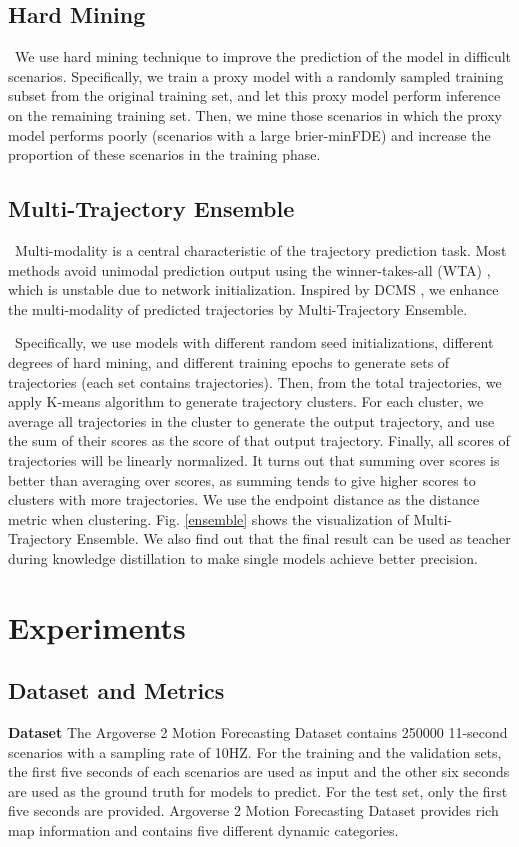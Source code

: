 \documentclass[10pt,twocolumn,letterpaper]{article}
\begin{document}
\subsection{Hard Mining}
    \ We use hard mining technique to improve the prediction of the model in difficult scenarios. Specifically, we train a proxy model with a randomly sampled training subset from the original training set, and let this proxy model perform inference on the remaining training set. Then, we mine those scenarios in which the proxy model performs poorly (scenarios with a large brier-minFDE) and increase the proportion of these scenarios in the training phase.
    
\subsection{Multi-Trajectory Ensemble}
    \ Multi-modality is a central characteristic of the trajectory prediction task. Most methods avoid unimodal prediction output using the winner-takes-all (WTA) \cite{lee2016stochastic}, which is unstable due to network initialization. Inspired by DCMS \cite{ye2022dcms}, we enhance the multi-modality of predicted trajectories by Multi-Trajectory Ensemble.
    
    \ Specifically, we use models with different random seed initializations, different degrees of hard mining, and different training epochs to generate  sets of trajectories (each set contains  trajectories). Then, from the total  trajectories, we apply K-means algorithm \cite{macqueen1967some} to generate  trajectory clusters. For each cluster, we average all trajectories in the cluster to generate the output trajectory, and use the sum of their scores as the score of that output trajectory. Finally, all  scores of trajectories will be linearly normalized. It turns out that summing over scores is better than averaging over scores, as summing tends to give higher scores to clusters with more trajectories. We use the endpoint distance as the distance metric when clustering. Fig. \ref{ensemble} shows the visualization of Multi-Trajectory Ensemble. We also find out that the final result can be used as teacher during knowledge distillation to make single models achieve better precision. 
    
\section{Experiments}
\subsection{Dataset and Metrics}
\noindent\textbf{Dataset} The Argoverse 2 Motion Forecasting Dataset \cite{wilson2021argoverse} contains 250000 11-second scenarios with a sampling rate of 10HZ. For the training and the validation sets, the first five seconds of each scenarios are used as input and the other six seconds are used as the ground truth for models to predict. For the test set, only the first five seconds are provided. Argoverse 2 Motion Forecasting Dataset provides rich map information and contains five different dynamic categories. 
\end{document}
